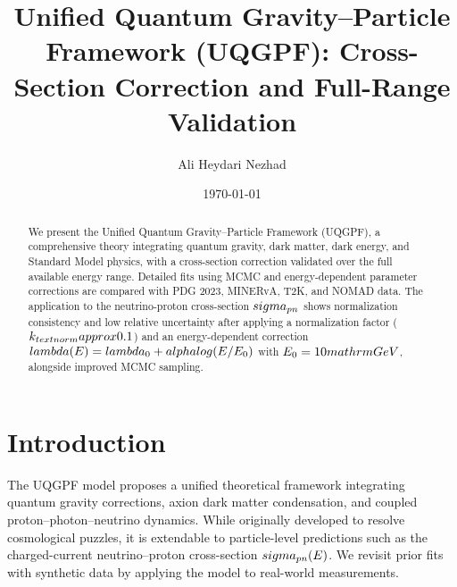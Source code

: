 \documentclass[aps,prd,reprint,superscriptaddress,showpacs,nofootinbib]{revtex4-2}
\begin{document}
\title{Unified Quantum Gravity--Particle Framework (UQGPF): Cross-Section Correction and Full-Range Validation}
\author{Ali Heydari Nezhad}
\date{\today}

\begin{abstract}
We present the Unified Quantum Gravity--Particle Framework (UQGPF), a comprehensive theory integrating quantum gravity, dark matter, dark energy, and Standard Model physics, with a cross-section correction validated over the full available energy range. Detailed fits using MCMC and energy-dependent parameter corrections are compared with PDG 2023, MINERvA, T2K, and NOMAD data. The application to the neutrino-proton cross-section $\\sigma_{pn}$ shows normalization consistency and low relative uncertainty after applying a normalization factor ($k_{\\text{norm}} \\approx 0.1$) and an energy-dependent correction $\\lambda(E) = \\lambda_0 + \\alpha \\log(E/E_0)$ with $E_0 = 10~\\mathrm{GeV}$, alongside improved MCMC sampling.
\end{abstract}

\maketitle

\section{Introduction}
The UQGPF model proposes a unified theoretical framework integrating quantum gravity corrections, axion dark matter condensation, and coupled proton--photon--neutrino dynamics. While originally developed to resolve cosmological puzzles, it is extendable to particle-level predictions such as the charged-current neutrino--proton cross-section $\\sigma_{pn}(E)$. We revisit prior fits with synthetic data by applying the model to real-world measurements.
\end{document}
